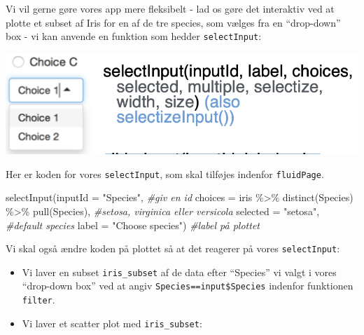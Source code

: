 \documentclass[
]{book}
\newenvironment{Shaded}{\begin{snugshade}}{\end{snugshade}}
\newcommand{\AttributeTok}[1]{\textcolor[rgb]{0.77,0.63,0.00}{#1}}
\newcommand{\CommentTok}[1]{\textcolor[rgb]{0.56,0.35,0.01}{\textit{#1}}}
\newcommand{\FunctionTok}[1]{\textcolor[rgb]{0.00,0.00,0.00}{#1}}
\newcommand{\NormalTok}[1]{#1}
\newcommand{\OtherTok}[1]{\textcolor[rgb]{0.56,0.35,0.01}{#1}}
\newcommand{\SpecialCharTok}[1]{\textcolor[rgb]{0.00,0.00,0.00}{#1}}
\newcommand{\StringTok}[1]{\textcolor[rgb]{0.31,0.60,0.02}{#1}}
\providecommand{\tightlist}{%
  \setlength{\itemsep}{0pt}\setlength{\parskip}{0pt}}
\begin{document}
Vi vil gerne gøre vores app mere fleksibelt - lad os gøre det interaktiv ved at plotte et subset af Iris for en af de tre species, som vælges fra en ``drop-down'' box - vi kan anvende en funktion som hedder \texttt{selectInput}:

\includegraphics[width=0.4\linewidth]{plots/selectInput}

Her er koden for vores \texttt{selectInput}, som skal tilføjes indenfor \texttt{fluidPage}.

\begin{Shaded}
\begin{Highlighting}[]
    \FunctionTok{selectInput}\NormalTok{(}\AttributeTok{inputId =} \StringTok{"Species"}\NormalTok{, }\CommentTok{\#giv en id}
                \AttributeTok{choices =}\NormalTok{ iris }\SpecialCharTok{\%\textgreater{}\%} \FunctionTok{distinct}\NormalTok{(Species) }\SpecialCharTok{\%\textgreater{}\%} \FunctionTok{pull}\NormalTok{(Species), }\CommentTok{\#setosa, virginica eller versicola}
                \AttributeTok{selected =} \StringTok{"setosa"}\NormalTok{, }\CommentTok{\#default species}
                \AttributeTok{label =} \StringTok{"Choose species"}\NormalTok{) }\CommentTok{\#label på plottet}
\end{Highlighting}
\end{Shaded}

Vi skal også ændre koden på plottet så at det reagerer på vores \texttt{selectInput}:

\begin{itemize}
\tightlist
\item
  Vi laver en subset \texttt{iris\_subset} af de data efter ``Species'' vi valgt i vores ``drop-down box'' ved at angiv \texttt{Species==input\$Species} indenfor funktionen \texttt{filter}.
\item
  Vi laver et scatter plot med \texttt{iris\_subset}:
\end{itemize}

\begin{Shaded}
\end{Shaded}
\end{document}
